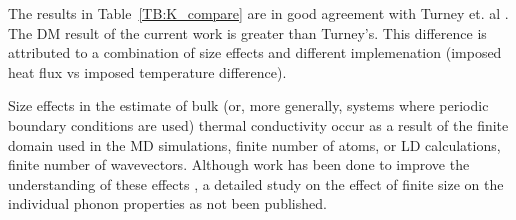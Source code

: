 The results in Table~\ref{TB:K_compare} are in good agreement with Turney et. al \cite{PhysRevB.79.064301}. The DM result of the current work is greater than Turney's. This difference is attributed to a combination of size effects and different implemenation (imposed heat flux vs imposed temperature difference).
 
Size effects in the estimate of bulk (or, more generally, systems where periodic boundary conditions are used) thermal conductivity occur as a result of the finite domain used in the MD simulations, finite number of atoms, or LD calculations, finite number of wavevectors. Although work has been done to improve the understanding of these effects \cite{dan}, a detailed study on the effect of finite size on the individual phonon properties as not been published.

